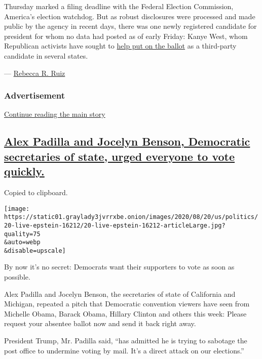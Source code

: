 Thursday marked a filing deadline with the Federal Election Commission,
America's election watchdog. But as robust disclosures were processed
and made public by the agency in recent days, there was one newly
registered candidate for president for whom no data had posted as of
early Friday: Kanye West, whom Republican activists have sought to
\href{https://www.nytimes3xbfgragh.onion/2020/08/04/us/politics/kanye-west-president-republicans.html}{help
put on the ballot} as a third-party candidate in several states.

--- \href{https://www.nytimes3xbfgragh.onion/by/rebecca-r-ruiz}{Rebecca
R. Ruiz}

\hypertarget{advertisement-4}{%
\subsubsection{Advertisement}\label{advertisement-4}}

\protect\hyperlink{after-dfp-ad-mid5}{Continue reading the main story}

\hypertarget{alex-padilla-and-jocelyn-benson-democratic-secretaries-of-state-urged-everyone-to-vote-quickly}{%
\subsection{\texorpdfstring{\protect\hyperlink{alex-padilla-and-jocelyn-benson-democratic-secretaries-of-state-urged-everyone-to-vote-quickly}{Alex
Padilla and Jocelyn Benson, Democratic secretaries of state, urged
everyone to vote
quickly.}}{Alex Padilla and Jocelyn Benson, Democratic secretaries of state, urged everyone to vote quickly.}}\label{alex-padilla-and-jocelyn-benson-democratic-secretaries-of-state-urged-everyone-to-vote-quickly}}

Copied to clipboard.

\texttt{[image: https://static01.graylady3jvrrxbe.onion/images/2020/08/20/us/politics/20-live-epstein-16212/20-live-epstein-16212-articleLarge.jpg?quality=75\\\&auto=webp\\\&disable=upscale]}

By now it's no secret: Democrats want their supporters to vote as soon
as possible.

Alex Padilla and Jocelyn Benson, the secretaries of state of California
and Michigan, repeated a pitch that Democratic convention viewers have
seen from Michelle Obama, Barack Obama, Hillary Clinton and others this
week: Please request your absentee ballot now and send it back right
away.

President Trump, Mr. Padilla said, ``has admitted he is trying to
sabotage the post office to undermine voting by mail. It's a direct
attack on our elections.''

